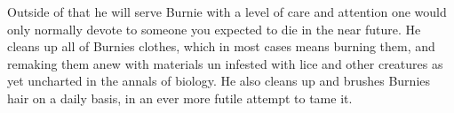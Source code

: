 Outside of that he will serve Burnie with a level of care and attention one would only normally devote to someone you expected to die in the near future. He cleans up all of Burnies clothes, which in most cases means burning them, and remaking them anew with materials un infested with lice and other creatures as yet uncharted in the annals of biology. He also cleans up and brushes Burnies hair on a daily basis, in an ever more futile attempt to tame it.\medskip

\vspace*{5mm}
